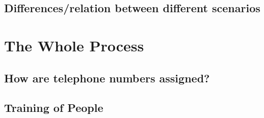 \subsection{Differences/relation between different scenarios}




\section{The Whole Process}

\subsection{How are telephone numbers assigned?}

\subsection{Training of People}
